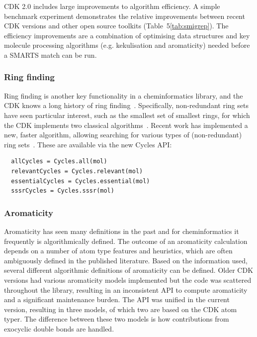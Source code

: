 \documentclass[10pt]{bmcart}
\def \cdkversion {2.0}
\begin{document}
CDK \cdkversion{} includes large improvements to algorithm
efficiency. A simple benchmark experiment demonstrates the relative
improvements between recent CDK versions and other open source
toolkits (Table~5\ref{tab:smigrep}). The efficiency improvements are a
combination of optimising data structures and key molecule processing
algorithms (e.g. kekulisation and aromaticity) needed before a SMARTS
match can be run.
  


\subsubsection*{Ring finding}

Ring finding is another key functionality in a cheminformatics library, and
the CDK knows a long history of ring finding~\cite{Berger2004,May2014}. Specifically,
non-redundant ring sets have seen particular interest,
such as the smallest set of smallest rings, for which the CDK
implements two classical algorithms~\cite{Figueras1996,Berger2004}.
Recent work has implemented a new, faster algorithm, allowing
searching for various types of (non-redundant) ring
sets~\cite{May2014}. These are available via the new Cycles API:

\vspace{0.2cm}
\begin{verbatim}
  allCycles = Cycles.all(mol)
  relevantCycles = Cycles.relevant(mol)
  essentialCycles = Cycles.essential(mol)
  sssrCycles = Cycles.sssr(mol)
\end{verbatim}
\vspace{0.2cm}

\subsubsection*{Aromaticity}

Aromaticity has seen many definitions in the past and for
cheminformatics it frequently is algorithmically defined. The outcome
of an aromaticity calculation depends on a number of atom type
features and heuristics, which are often ambiguously defined in the
published literature. Based on the information used, several different
algorithmic definitions of aromaticity can be defined. Older CDK
versions had various aromaticity models implemented but the code was scattered
throughout the library, resulting in an inconsistent API
to compute aromaticity and a significant maintenance
burden.  The API was unified in the current version, resulting in three
models, of which two are based on the CDK atom typer. The difference
between these two models is how contributions from exocyclic double
bonds are handled.
\end{document}
